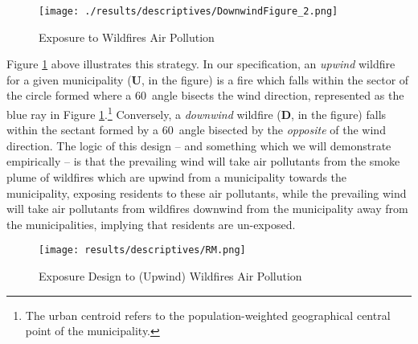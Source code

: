\documentclass[11pt]{article}
\begin{document}
\begin{spacing}{1.5}
\begin{figure}[htpb!]
    \centering
    \vspace{1mm}
    \texttt{[image: ./results/descriptives/DownwindFigure\_2.png]}
    \caption{Exposure to Wildfires Air Pollution}
    \label{fig:Downwind_Fig}
    \vspace{2mm}
\end{figure}

Figure \ref{fig:Downwind_Fig} above illustrates this strategy. In our specification, an \textit{upwind} wildfire for a given municipality (\textbf{U}, in the figure) is a fire which falls within the sector of the circle formed where a 60\textdegree\  angle bisects the wind direction, represented as the blue ray in Figure \ref{fig:Downwind_Fig}.\footnote{The urban centroid refers to the population-weighted geographical central point of the municipality.} %
Conversely, a \textit{downwind} wildfire (\textbf{D}, in the figure) falls within the sectant formed by a 60\textdegree\ angle bisected by the \emph{opposite} of the wind direction.  The logic of this design -- and something which we will demonstrate empirically -- is that the prevailing wind will take air pollutants from the smoke plume of wildfires which are upwind from a municipality towards the municipality, exposing residents to these air pollutants, while the prevailing wind will take air pollutants from wildfires downwind from the municipality away from the municipalities, implying that residents are un-exposed.

\begin{figure}[ht!]
    \centering
    \texttt{[image: results/descriptives/RM.png]}
    \caption{Exposure Design to (Upwind) Wildfires Air Pollution}
    \label{fig:design2}
\end{figure}    


\end{spacing}
\end{document}
